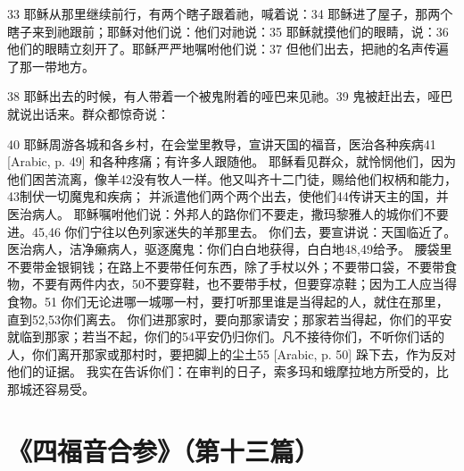 33  耶稣从那里继续前行，有两个瞎子跟着祂，喊着说：34  耶稣进了屋子，那两个瞎子来到祂跟前；耶稣对他们说：他们对祂说：35  耶稣就摸他们的眼睛，说：36  他们的眼睛立刻开了。耶稣严严地嘱咐他们说：37  但他们出去，把祂的名声传遍了那一带地方。\par

38  耶稣出去的时候，有人带着一个被鬼附着的哑巴来见祂。39  鬼被赶出去，哑巴就说出话来。群众都惊奇说：\par

40  耶稣周游各城和各乡村，在会堂里教导，宣讲天国的福音，医治各种疾病41 [Arabic, p. 49] 和各种疼痛；有许多人跟随他。 耶稣看见群众，就怜悯他们，因为他们困苦流离，像羊42没有牧人一样。他又叫齐十二门徒，赐给他们权柄和能力，43制伏一切魔鬼和疾病； 并派遣他们两个两个出去，使他们44传讲天主的国，并医治病人。 耶稣嘱咐他们说：外邦人的路你们不要走，撒玛黎雅人的城你们不要进。45,46  你们宁往以色列家迷失的羊那里去。 你们去，要宣讲说：天国临近了。 医治病人，洁净癞病人，驱逐魔鬼：你们白白地获得，白白地48,49给予。 腰袋里不要带金银铜钱；在路上不要带任何东西，除了手杖以外；不要带口袋，不要带食物，不要有两件内衣，50不要穿鞋，也不要带手杖，但要穿凉鞋；因为工人应当得食物。51  你们无论进哪一城哪一村，要打听那里谁是当得起的人，就住在那里，直到52,53你们离去。 你们进那家时，要向那家请安；那家若当得起，你们的平安就临到那家；若当不起，你们的54平安仍归你们。凡不接待你们，不听你们话的人，你们离开那家或那村时，要把脚上的尘土55 [Arabic, p. 50] 跺下去，作为反对他们的证据。 我实在告诉你们：在审判的日子，索多玛和蛾摩拉地方所受的，比那城还容易受。\par



\section{《四福音合参》（第十三篇）}

